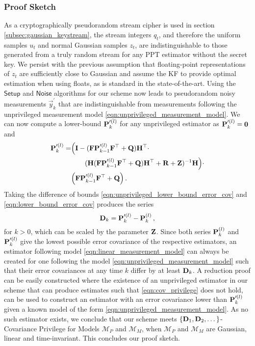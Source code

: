\documentclass[letterpaper, 10 pt, conference]{IEEEtran}
\theoremstyle{definition}
\begin{document}
\subsubsection{Proof Sketch}
As a cryptographically pseudorandom stream cipher is used in section \ref{subsec:gaussian_keystream}, the stream integers $q_t$, and therefore the uniform samples $u_t$ and normal Gaussian samples $z_t$, are indistinguishable to those generated from a truly random stream for any PPT estimator without the secret key. We persist with the previous assumption that floating-point representations of $z_t$ are sufficiently close to Gaussian and assume the KF to provide optimal estimation when using floats, as is standard in the state-of-the-art. Using the $\mathsf{Setup}$ and $\mathsf{Noise}$ algorithms for our scheme now leads to pseudorandom noisy measurements $\vec{y}^\prime_k$ that are indistinguishable from measurements following the unprivileged measurement model \eqref{eqn:unprivileged_measurement_model}. We can now compute a lower-bound ${{\mathbf{P}}}_k^{\prime(l)}$ for any unprivileged estimator as ${{\mathbf{P}}}_k^{\prime(l)}={{\mathbf{0}}}$ and
\begin{equation}\label{eqn:unprivileged_lower_bound_error_cov}
   \begin{split}
      \mat{P}_k^{\prime(l)} =& \Bigl( \mat{I} - (\mat{F}\mat{P}_{k-1}^{\prime(l)}\mat{F}^\top + \mat{Q})\mat{H}^\top \cdot \\
      &\qquad(\mat{H}(\mat{F}\mat{P}_{k-1}^{\prime(l)}\mat{F}^\top + \mat{Q})\mat{H}^\top + \mat{R}+\mat{Z})^{-1}\mat{H}\Bigr)\cdot\\
      &\Bigl(\mat{F}\mat{P}_{k-1}^{\prime(l)}\mat{F}^\top + \mat{Q}\Bigr)\,.
   \end{split}
\end{equation}
Taking the difference of bounds \eqref{eqn:unprivileged_lower_bound_error_cov} and \eqref{eqn:lower_bound_error_cov} produces the series
\begin{equation}\label{eqn:covariance_difference_series}
   \mat{D}_k = \mat{P}_k^{\prime(l)} - \mat{P}_k^{(l)}\,,
\end{equation}
for $k>0$, which can be scaled by the parameter ${{\mathbf{Z}}}$. Since both series ${{\mathbf{P}}}_k^{(l)}$ and ${{\mathbf{P}}}_k^{\prime(l)}$ give the lowest possible error covariance of the respective estimators, an estimator following model \eqref{eqn:linear_measurement_model} can always be created for one following the model \eqref{eqn:unprivileged_measurement_model} such that their error covariances at any time $k$ differ by at least ${{\mathbf{D}}}_k$. A reduction proof can be easily constructed where the existence of an unprivileged estimator in our scheme that can produce estimates such that \eqref{eqn:cov_privilege} does not hold, can be used to construct an estimator with an error covariance lower than ${{\mathbf{P}}}_k^{\prime(l)}$ given a known model of the form \eqref{eqn:unprivileged_measurement_model}. As no such estimator exists, we conclude that our scheme meets $\{{{\mathbf{D}}}_1,{{\mathbf{D}}}_2,\dots\}$-Covariance Privilege for Models $\mathcal{M}_P$ and $\mathcal{M}_M$, when $\mathcal{M}_P$ and $\mathcal{M}_M$ are Gaussian, linear and time-invariant. This concludes our proof sketch.
\end{document}
